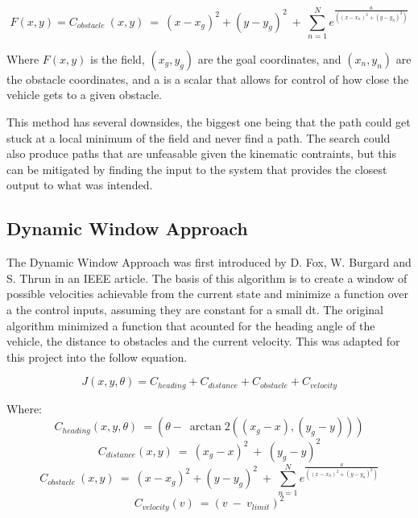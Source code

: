 \documentclass{article}
\begin{document}
        \begin{equation}
            F(x,y) = C_{obstacle}\ \left(x,y\right)\ =\ \left(x-x_{g}\right)^{2}+\left(y-y_{g}\right)^{2}\ +\ \sum_{n=1}^{N}e^{\frac{a}{\left(\left(x-x_{n}\right)^{2}+\left(y-y_{n}\right)^{2}\right)}}
        \end{equation}
        
        Where  \begin{math} F(x,y )\end{math} is the field, \begin{math} (x_{g},y_{g}) \end{math} are the goal coordinates, and \begin{math} (x_{n},y_{n})\end{math} are the obstacle coordinates, and a is a scalar that allows for control of how close the vehicle gets to a given obstacle.

        This method has several downsides, the biggest one being that the path could get stuck at a local minimum of the field and never find a path. The search could also produce paths that are unfeasable given the kinematic contraints, but this can be mitigated by finding the input to the system that provides the closest output to what was intended.

    \subsection{Dynamic Window Approach}
        The Dynamic Window Approach was first introduced by D. Fox, W. Burgard and S. Thrun in an IEEE article. The basis of this algorithm is to create a window of possible velocities achievable from the current state and minimize a function over a the control inputs, assuming they are constant for a small dt. The original algorithm minimized a function that acounted for the heading angle of the vehicle, the distance to obstacles and the current velocity. This was adapted for this project into the follow equation.

        \begin{equation}
            J\left(x,y,\theta\right)=C_{heading}+C_{distance}+C_{obstacle}+C_{velocity}
        \end{equation}
        
        Where:
        \begin{equation} C_{heading}\left(x,y,\theta\right)\ =\left(\theta-\ \arctan2\left(\left(x_{g}-x\right),\left(y_{g}-y\right)\right)\right)\end{equation}
        \begin{equation} C_{distance}\left(x,y\right)\ =\ \left(x_{g}-x\right)^{2}\ +\ \left(y_{g}-y\right)^{2} \end{equation}
        \begin{equation} C_{obstacle}\ \left(x,y\right)\ =\ \left(x-x_{g}\right)^{2}+\left(y-y_{g}\right)^{2}\ +\ \sum_{n=1}^{N}e^{\frac{a}{\left(\left(x-x_{n}\right)^{2}+\left(y-y_{n}\right)^{2}\right)}}\end{equation}
        \begin{equation} C_{velocity}\left(v\right)\ =\left(v\ -\ v_{limit}\right)^{2} \end{equation}
\end{document}
